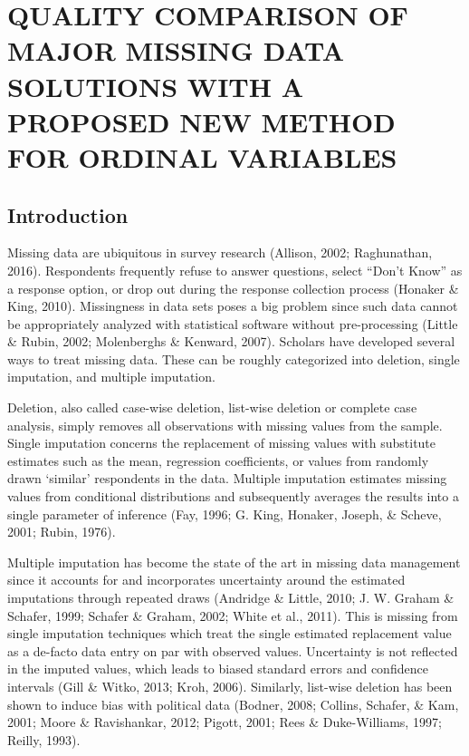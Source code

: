 \documentclass[12pt,econ]{sources/authesis}
\begin{document}
\hypertarget{ordmiss}{%
\chapter{QUALITY COMPARISON OF MAJOR MISSING DATA SOLUTIONS WITH A PROPOSED NEW METHOD FOR ORDINAL VARIABLES}\label{ordmiss}}

\hypertarget{ordmiss-intro}{%
\section{Introduction}\label{ordmiss-intro}}

Missing data are ubiquitous in survey research (Allison, 2002; Raghunathan, 2016). Respondents frequently refuse to answer questions, select ``Don't Know'' as a response option, or drop out during the response collection process (Honaker \& King, 2010). Missingness in data sets poses a big problem since such data cannot be appropriately analyzed with statistical software without pre-processing (Little \& Rubin, 2002; Molenberghs \& Kenward, 2007). Scholars have developed several ways to treat missing data. These can be roughly categorized into deletion, single imputation, and multiple imputation.

Deletion, also called case-wise deletion, list-wise deletion or complete case analysis, simply removes all observations with missing values from the sample. Single imputation concerns the replacement of missing values with substitute estimates such as the mean, regression coefficients, or values from randomly drawn `similar' respondents in the data. Multiple imputation estimates missing values from conditional distributions and subsequently averages the results into a single parameter of inference (Fay, 1996; G. King, Honaker, Joseph, \& Scheve, 2001; Rubin, 1976).

Multiple imputation has become the state of the art in missing data management since it accounts for and incorporates uncertainty around the estimated imputations through repeated draws (Andridge \& Little, 2010; J. W. Graham \& Schafer, 1999; Schafer \& Graham, 2002; White et al., 2011). This is missing from single imputation techniques which treat the single estimated replacement value as a de-facto data entry on par with observed values. Uncertainty is not reflected in the imputed values, which leads to biased standard errors and confidence intervals (Gill \& Witko, 2013; Kroh, 2006). Similarly, list-wise deletion has been shown to induce bias with political data (Bodner, 2008; Collins, Schafer, \& Kam, 2001; Moore \& Ravishankar, 2012; Pigott, 2001; Rees \& Duke-Williams, 1997; Reilly, 1993).
\end{document}
